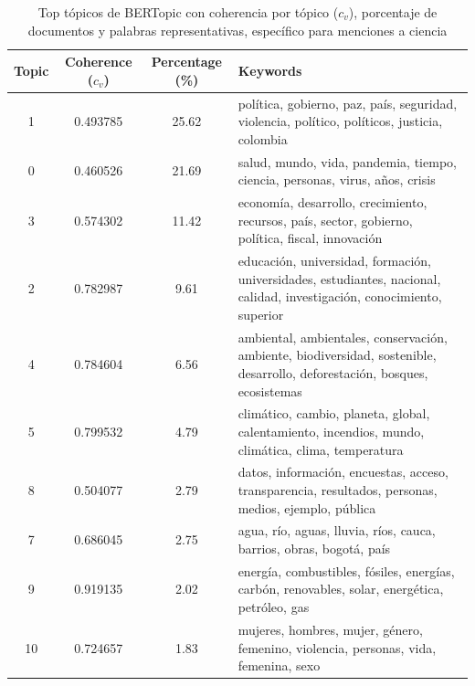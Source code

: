 \documentclass[11pt,a4paper]{article}
\begin{document}
		\begin{table}[H]
			\centering
			\small
			\begin{tabularx}{\textwidth}{c c c X}
				\hline
				\textbf{Topic} & \textbf{Coherence ($c_v$)} & \textbf{Percentage (\%)} & \textbf{Keywords} \\
				\hline
				1  & 0.493785 & 25.62 & política, gobierno, paz, país, seguridad, violencia, político, políticos, justicia, colombia \\
				0  & 0.460526 & 21.69 & salud, mundo, vida, pandemia, tiempo, ciencia, personas, virus, años, crisis \\
				3  & 0.574302 & 11.42 & economía, desarrollo, crecimiento, recursos, país, sector, gobierno, política, fiscal, innovación \\
				2  & 0.782987 & 9.61  & educación, universidad, formación, universidades, estudiantes, nacional, calidad, investigación, conocimiento, superior \\
				4  & 0.784604 & 6.56  & ambiental, ambientales, conservación, ambiente, biodiversidad, sostenible, desarrollo, deforestación, bosques, ecosistemas \\
				5  & 0.799532 & 4.79  & climático, cambio, planeta, global, calentamiento, incendios, mundo, climática, clima, temperatura \\
				8  & 0.504077 & 2.79  & datos, información, encuestas, acceso, transparencia, resultados, personas, medios, ejemplo, pública \\
				7  & 0.686045 & 2.75  & agua, río, aguas, lluvia, ríos, cauca, barrios, obras, bogotá, país \\
				9  & 0.919135 & 2.02  & energía, combustibles, fósiles, energías, carbón, renovables, solar, energética, petróleo, gas \\
				10 & 0.724657 & 1.83  & mujeres, hombres, mujer, género, femenino, violencia, personas, vida, femenina, sexo \\
				\hline
			\end{tabularx}
			\caption{Top tópicos de BERTopic con coherencia por tópico ($c_v$), porcentaje de documentos y palabras representativas, específico para menciones a ciencia}
			\label{tab:topics_ciencia}
		\end{table}
		
		
		
\end{document}
